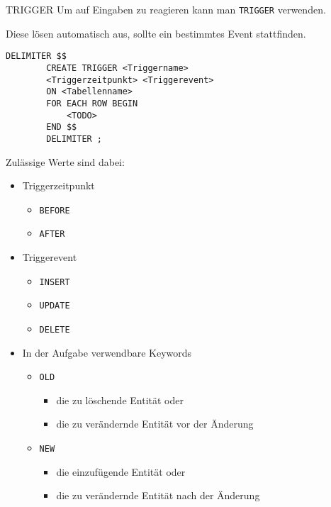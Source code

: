 \begin{sql}{TRIGGER}
    Um auf Eingaben zu reagieren kann man \texttt{TRIGGER} verwenden.

    Diese lösen automatisch aus, sollte ein bestimmtes Event stattfinden.

    \begin{lstlisting}[language=mysql]
        DELIMITER $$
        CREATE TRIGGER <Triggername>
        <Triggerzeitpunkt> <Triggerevent>
        ON <Tabellenname>
        FOR EACH ROW BEGIN
            <TODO>
        END $$
        DELIMITER ;
    \end{lstlisting}

    Zulässige Werte sind dabei:

    \begin{itemize}
        \item Triggerzeitpunkt

              \begin{itemize}
                  \item \texttt{BEFORE}
                  \item \texttt{AFTER}
              \end{itemize}
        \item Triggerevent

              \begin{itemize}
                  \item \texttt{INSERT}
                  \item \texttt{UPDATE}
                  \item \texttt{DELETE}
              \end{itemize}
        \item In der Aufgabe verwendbare Keywords

              \begin{itemize}
                  \item \texttt{OLD}

                        \begin{itemize}
                            \item die zu löschende Entität oder
                            \item die zu verändernde Entität vor der Änderung
                        \end{itemize}
                  \item \texttt{NEW}

                        \begin{itemize}
                            \item die einzufügende Entität oder
                            \item die zu verändernde Entität nach der Änderung
                        \end{itemize}
              \end{itemize}
    \end{itemize}


\end{sql}
